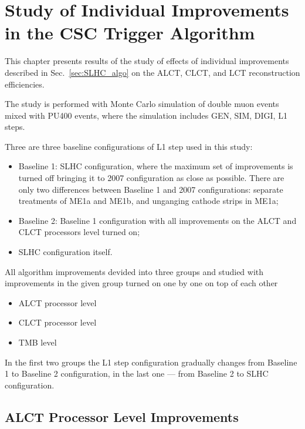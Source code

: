 \section{Study of Individual Improvements in the CSC Trigger Algorithm}
\label{sec:SLHC_algo_results}

This chapter presents results of the study of effects of individual improvements described in Sec.~\ref{sec:SLHC_algo} on the ALCT, CLCT, and LCT reconstruction efficiencies.

The study is performed with Monte Carlo simulation of double muon events mixed with PU400 events, where the simulation includes GEN, SIM, DIGI, L1 steps.

Three are three baseline configurations of L1 step used in this study:
\begin{itemize}
	\item Baseline 1: SLHC configuration, where the maximum set of improvements is turned off bringing it to 2007 configuration as close as possible. 
	There are only two differences between Baseline 1 and 2007 configurations: separate treatments of ME1a and ME1b, and unganging cathode strips in ME1a;
	\item Baseline 2: Baseline 1 configuration with all improvements on the ALCT and CLCT processors level turned on;
	\item SLHC configuration itself.
\end{itemize}

All algorithm improvements devided into three groups and studied with improvements in the given group turned on one by one on top of each other
\begin{itemize}
	\item ALCT processor level
	\item CLCT processor level
	\item TMB level
\end{itemize}

In the first two groups the L1 step configuration gradually changes from Baseline 1 to Baseline 2 configuration, in the last one --- from Baseline 2 to SLHC configuration.

\newpage

\subsection{ALCT Processor Level Improvements}

